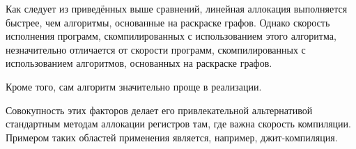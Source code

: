 Как следует из приведённых выше сравнений, линейная аллокация выполняется быстрее, чем алгоритмы,
основанные на раскраске графов.
Однако скорость исполнения программ, скомпилированных с использованием
этого алгоритма, незначительно отличается от скорости программ,
скомпилированных с использованием алгоритмов,
основанных на раскраске графов.

Кроме того, сам алгоритм значительно проще в реализации.

Совокупность этих факторов делает его привлекательной альтернативой стандартным методам аллокации регистров там,
где важна скорость компиляции.
Примером таких областей применения является, например, джит-компиляция.
